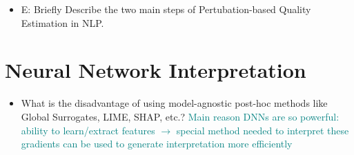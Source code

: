 \documentclass{report}
\newcommand{\asw}[2][teal]{}
\renewcommand{\asw}[2][teal]{\textcolor{#1}{#2}}
\begin{document}
		\begin{itemize}
		\item E: Briefly Describe the two main steps of Pertubation-based Quality Estimation in NLP.
		\asw{\newline }
		\end{itemize}
	\newpage
	
	\section{Neural Network Interpretation}
	
	\begin{itemize}
		\item What is the disadvantage of using model-agnostic post-hoc methods like Global Surrogates, LIME, SHAP, etc.?
		\asw{\newline Main reason DNNs are so powerful: ability to learn/extract features
			\newline $\rightarrow$ special method needed to interpret these
			\newline gradients can be used to generate interpretation more efficiently}
		

\end{itemize}
\end{document}
